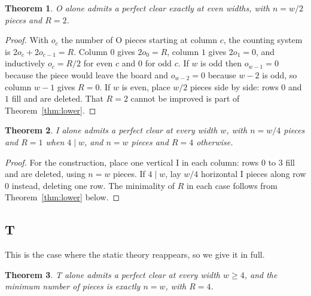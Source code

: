 \documentclass[11pt,a4paper]{article}
\theoremstyle{plain}
\newtheorem{theorem}{Theorem}
\theoremstyle{definition}
\theoremstyle{remark}
\begin{document}
\begin{theorem}
\label{thm:O}
O alone admits a perfect clear exactly at even widths, with $n = w/2$ pieces and
$R = 2$.
\end{theorem}

\begin{proof}
With $o_c$ the number of O pieces starting at column $c$, the counting system is
$2o_c + 2o_{c-1} = R$. Column $0$ gives $2o_0 = R$, column $1$ gives $2o_1 = 0$, and
inductively $o_c = R/2$ for even $c$ and $0$ for odd $c$. If $w$ is odd then
$o_{w-1} = 0$ because the piece would leave the board and $o_{w-2} = 0$ because
$w-2$ is odd, so column $w-1$ gives $R = 0$. If $w$ is even, place $w/2$ pieces side
by side: rows $0$ and $1$ fill and are deleted. That $R = 2$ cannot be improved is
part of Theorem~\ref{thm:lower}.
\end{proof}

\begin{theorem}
\label{thm:I}
I alone admits a perfect clear at every width $w$, with $n = w/4$ pieces and $R=1$
when $4 \mid w$, and $n = w$ pieces and $R = 4$ otherwise.
\end{theorem}

\begin{proof}
For the construction, place one vertical I in each column: rows $0$ to $3$ fill and
are deleted, using $n = w$ pieces. If $4 \mid w$, lay $w/4$ horizontal I pieces along
row $0$ instead, deleting one row. The minimality of $R$ in each case follows from
Theorem~\ref{thm:lower} below.
\end{proof}

\subsection{T}

This is the case where the static theory reappears, so we give it in full.

\begin{theorem}
\label{thm:T}
T alone admits a perfect clear at every width $w \geq 4$, and the minimum number of
pieces is exactly $n = w$, with $R = 4$.
\end{theorem}
\end{document}
